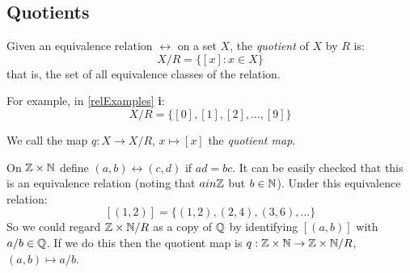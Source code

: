 \documentclass[../main.tex]{subfiles}
\begin{document}
\subsection{Quotients}
\begin{definition}[Quotient]
  Given an equivalence relation $\rel$ on a set $X$, the \textit{quotient} of $X$ by $R$ is:
  \[
    X/R = \{[x]: x \in X\}
  \]
  that is, the set of all equivalence classes of the relation.
\end{definition}
\begin{example}
  For example, in \cref{relExamples} \textbf{i}:
  \[
    X/R = \{[0], [1], [2], \ldots, [9]\}
  \]
\end{example}
\begin{definition}
  We call the map $q: X \to X/R$, $x \mapsto [x]$ the \textit{quotient map}.
\end{definition}
\begin{example}
  On $\mathbb{Z}\times\mathbb{N}$ define $(a, b) \rel (c, d)$ if $ad = bc$.
  It can be easily checked that this is an equivalence relation (noting that $a in \mathbb{Z}$ but $b \in \mathbb{N}$).
  Under this equivalence relation:
  \[
    [(1, 2)] = \{(1, 2), (2, 4), (3, 6), \ldots\}
  \]
  So we could regard $\mathbb{Z} \times \mathbb{N} / R$ as a copy of $\mathbb{Q}$ by identifying $[(a, b)]$ with $a/b \in \mathbb{Q}$.
  If we do this then the quotient map is $q: \mathbb{Z}\times\mathbb{N} \to \mathbb{Z}\times\mathbb{N}/R$, $(a, b) \mapsto a/b$.
\end{example}
\end{document}
